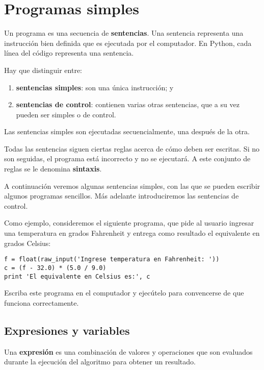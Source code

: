 \chapter{Programas simples}

Un programa es una secuencia de \textbf{sentencias}. Una sentencia
representa una instrucción bien definida que es ejecutada por el
computador. En Python, cada línea del código representa una sentencia.

Hay que distinguir entre:

\begin{enumerate}
\item
  \textbf{sentencias simples}: son una única instrucción; y
\item
  \textbf{sentencias de control}: contienen varias otras sentencias, que
  a su vez pueden ser simples o de control.
\end{enumerate}

Las sentencias simples son ejecutadas secuencialmente, una después de la
otra.

Todas las sentencias siguen ciertas reglas acerca de cómo deben ser
escritas. Si no son seguidas, el programa está incorrecto y no se
ejecutará. A este conjunto de reglas se le denomina \textbf{sintaxis}.

A continuación veremos algunas sentencias simples, con las que se pueden
escribir algunos programas sencillos. Más adelante introduciremos las
sentencias de control.

Como ejemplo, consideremos el siguiente programa, que pide al usuario
ingresar una temperatura en grados Fahrenheit y entrega como resultado
el equivalente en grados Celsius:

\begin{lstlisting}
f = float(raw_input('Ingrese temperatura en Fahrenheit: '))
c = (f - 32.0) * (5.0 / 9.0)
print 'El equivalente en Celsius es:', c
\end{lstlisting}

Escriba este programa en el computador
y ejecútelo para convencerse de que funciona correctamente.

\section{Expresiones y variables}

Una \textbf{expresión} es una combinación de valores y operaciones que
son evaluados durante la ejecución del algoritmo para obtener un
resultado.

